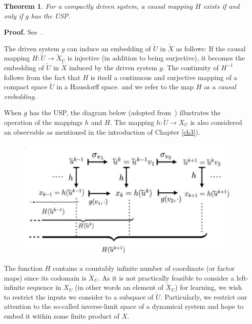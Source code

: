 \documentclass[a4paper,12pt,twoside]{report}
\newtheorem{Theorem}{Theorem}[]
\begin{document}
 \begin{Theorem}
  For a compactly driven system, a causal mapping $H$ exists if and only if $g$ has the USP. 
\end{Theorem}
{\bf Proof.}  See~\cite[Th.3]{manjunath2013echo}.

The driven system $g$ can induce an embedding of $\overleftarrow{U}$ in $\overleftarrow{X}$ as follows: 
If the causal mapping $H:\overleftarrow{U}{\to}{\overleftarrow{X}_U}$ is injective (in addition to being surjective), it becomes the embedding of $\overleftarrow{U}$ in $\overleftarrow{X}$ induced by the driven system $g$. 
The continuity of $H^{-1}$ follows from the fact that $H$ is itself a continuous and surjective mapping of a compact space $\overleftarrow{U}$ in a Hausdorff space.
and we refer to the map $H$ as a \emph{causal embedding}. 

When $g$ has the USP, the diagram below (adopted from~\cite{Manju_Nonlinearity}) illustrates the operation of the mappings $h$ and $H$. The mapping $h:\overleftarrow{U}\to{X_U}$ is also considered an observable as mentioned in the introduction of Chapter \ref{ch3}).  

\begin{figure}[ht]
  \includegraphics[scale=0.4]{_actionofh_H.eps}
  \centering
  \label{fig:actionh_H}
\end{figure}

The function $H$ contains a countably infinite number of coordinate (or factor maps) since its codomain is $\overleftarrow{X}_U$.  
As it is not practically feasible to consider a left-infinite sequence in $X_U$ (in other words an element of  $\overleftarrow{X}_U$) for learning, we wish to restrict the inputs we consider to a subspace of $\overleftarrow{U}$. 
Particularly, we restrict our attention to the  so-called inverse-limit space of a dynamical system and hope to embed it within some finite product of $X$. 
\end{document}
